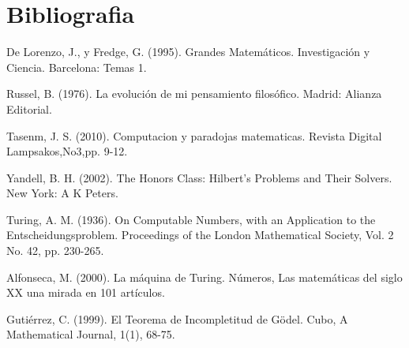 \documentclass{article}
\begin{document}
\begin{center}
\end{center}

\section{Bibliografia}
De Lorenzo, J., y Fredge, G. (1995). Grandes Matemáticos. Investigación y Ciencia. Barcelona: Temas 1.
\vspace{10pt}

Russel, B. (1976). La evolución de mi pensamiento filosófico. Madrid: Alianza Editorial.
\vspace{10pt}

Tasenm, J. S. (2010). Computacion y paradojas matematicas. Revista Digital Lampsakos,No3,pp. 9-12.
\vspace{10pt}

Yandell, B. H. (2002). The Honors Class: Hilbert's Problems and Their Solvers. New York: A K Peters.
\vspace{10pt}

Turing, A. M. (1936). On Computable Numbers, with an Application to the Entscheidungsproblem. Proceedings of the London Mathematical Society, Vol. 2 No. 42, pp. 230-265.
\vspace{10pt}

Alfonseca, M. (2000). La máquina de Turing. Números, Las matemáticas del siglo XX una mirada en 101 artículos.
\vspace{10pt}

Gutiérrez, C. (1999). El Teorema de Incompletitud de Gödel. Cubo, A Mathematical Journal, 1(1), 68-75.
\vspace{10pt}
\end{document}
